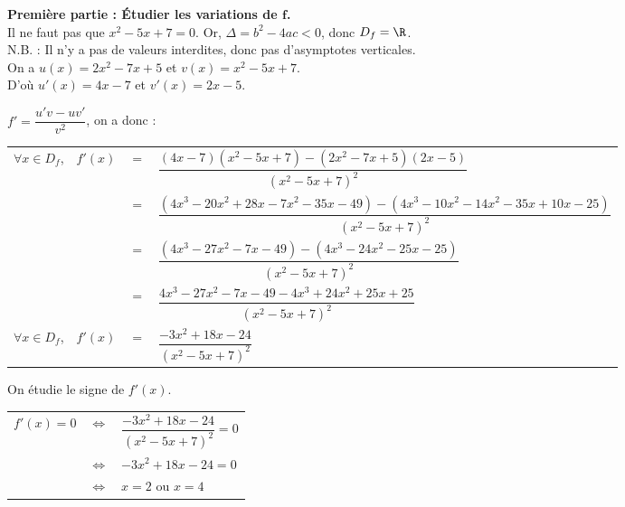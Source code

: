 \textbf{Première partie : Étudier les variations de $\mathbf{f}$.} \\

Il ne faut pas que $x^2 - 5x + 7 = 0$. Or, $\Delta = b^2 - 4ac < 0$, donc $D_f = \R$. \\

N.B. : Il n'y a pas de valeurs interdites, donc pas d'asymptotes verticales. \\

On a $u(x) = 2x^2 - 7x +5$ et $v(x) = x^2 - 5x + 7$. \\
D'où $u'(x) = 4x - 7$ et $v'(x) = 2x - 5$. \\

\vspace*{.3cm}

$f' = \dfrac{u'v - uv'}{v^2}$, on a donc :

\begin{tabular}{llll}
$\forall x \in D_f$, & $f'(x)$ & $=$ & $\dfrac{\left(4x-7\right)\left(x^2 - 5x + 7\right)-\left(2x^2 - 7x + 5\right)\left(2x-5\right)}{\left(x^2 - 5x + 7\right)^2}$ \vspace*{.3cm} \\
& & $=$ & $\dfrac{\left(4x^3 - 20x^2 + 28x - 7x^2 - 35x - 49\right)-\left(4x^3 - 10x^2 - 14x^2 - 35x + 10x - 25\right)}{\left(x^2 - 5x + 7\right)^2}$ \vspace*{.3cm} \\
& & $=$ & $\dfrac{\left(4x^3 - 27x^2 - 7x - 49\right)-\left(4x^3 - 24x^2 - 25x - 25\right)}{\left(x^2 - 5x + 7\right)^2}$ \vspace*{.3cm} \\
& & $=$ & $\dfrac{4x^3 - 27x^2 - 7x - 49 - 4x^3 + 24x^2 + 25x + 25}{\left(x^2 - 5x + 7\right)^2}$ \vspace*{.3cm} \\
$\forall x \in D_f$, & $f'(x)$ & $=$ & $\dfrac{-3x^2 + 18x - 24}{\left(x^2 - 5x + 7\right)^2}$ \vspace*{.3cm} \\
\end{tabular}

On étudie le signe de $f'(x)$. \\

\begin{tabular}{lll}
$f'(x) = 0$ & $\Longleftrightarrow$ & $\dfrac{-3x^2 + 18x - 24}{\left(x^2 - 5x + 7\right)^2} = 0$ \vspace*{.3cm} \\
& $\Longleftrightarrow$ & $-3x^2 + 18x - 24 = 0$ \vspace*{.3cm} \\
& $\Longleftrightarrow$ & $x= 2$ ou $x = 4$ \vspace*{.3cm}\\
\end{tabular}

